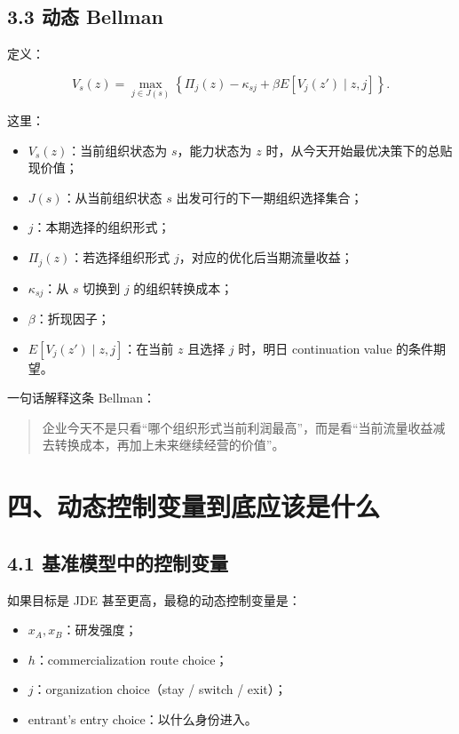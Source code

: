 \documentclass[12pt]{ctexart}
\begin{document}
\subsection{3.3 动态 Bellman}

定义：

\[
V_s(z)=
\max_{j\in J(s)}
\left\{
\Pi_j(z)-\kappa_{sj}
+\beta E[V_j(z')\mid z,j]
\right\}.
\]

这里：

\begin{itemize}[leftmargin=2em]
    \item \(V_s(z)\)：当前组织状态为 \(s\)，能力状态为 \(z\) 时，从今天开始最优决策下的总贴现价值；
    \item \(J(s)\)：从当前组织状态 \(s\) 出发可行的下一期组织选择集合；
    \item \(j\)：本期选择的组织形式；
    \item \(\Pi_j(z)\)：若选择组织形式 \(j\)，对应的优化后当期流量收益；
    \item \(\kappa_{sj}\)：从 \(s\) 切换到 \(j\) 的组织转换成本；
    \item \(\beta\)：折现因子；
    \item \(E[V_j(z')\mid z,j]\)：在当前 \(z\) 且选择 \(j\) 时，明日 continuation value 的条件期望。
\end{itemize}

一句话解释这条 Bellman：

\begin{quote}
企业今天不是只看“哪个组织形式当前利润最高”，而是看“当前流量收益减去转换成本，再加上未来继续经营的价值”。
\end{quote}

\section{四、动态控制变量到底应该是什么}

\subsection{4.1 基准模型中的控制变量}

如果目标是 JDE 甚至更高，最稳的动态控制变量是：

\begin{itemize}[leftmargin=2em]
    \item \(x_A, x_B\)：研发强度；
    \item \(h\)：commercialization route choice；
    \item \(j\)：organization choice（stay / switch / exit）；
    \item entrant's entry choice：以什么身份进入。
\end{itemize}
\end{document}
